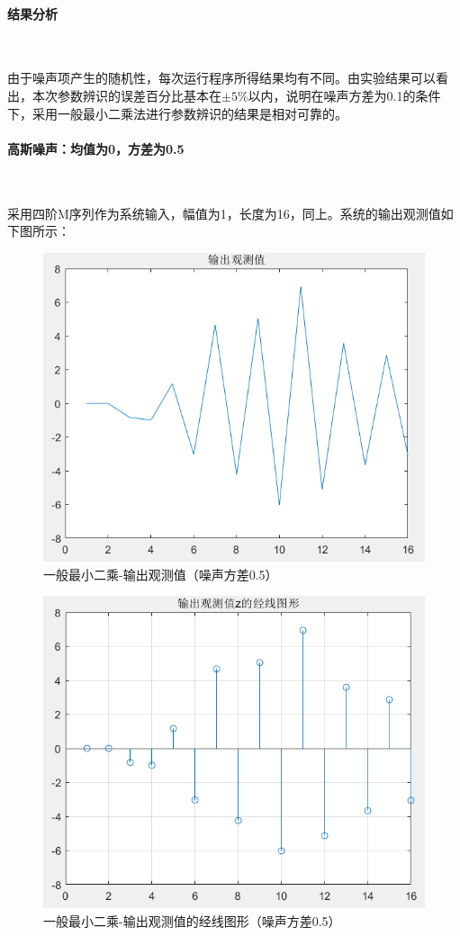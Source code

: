 \documentclass[UTF8]{article}
\begin{document}
\paragraph{结果分析}~{}

由于噪声项产生的随机性，每次运行程序所得结果均有不同。由实验结果可以看出，本次参数辨识的误差百分比基本在$\pm 5\%$以内，说明在噪声方差为0.1的条件下，采用一般最小二乘法进行参数辨识的结果是相对可靠的。


\paragraph{高斯噪声：均值为0，方差为0.5}~{}

采用四阶M序列作为系统输入，幅值为1，长度为16，同上。系统的输出观测值如下图所示：
\begin{figure}[H]
    \centering %
    \includegraphics[width=.8\textwidth]{figure/一般最小二乘-输出观测值（噪声方差0.5）.png} 
    \caption{一般最小二乘-输出观测值（噪声方差0.5）} %
\end{figure}
\begin{figure}[H]
    \centering %
    \includegraphics[width=.8\textwidth]{figure/一般最小二乘-输出观测值的经线图形（噪声方差0.5）.png} 
    \caption{一般最小二乘-输出观测值的经线图形（噪声方差0.5）} %
\end{figure}
\end{document}
